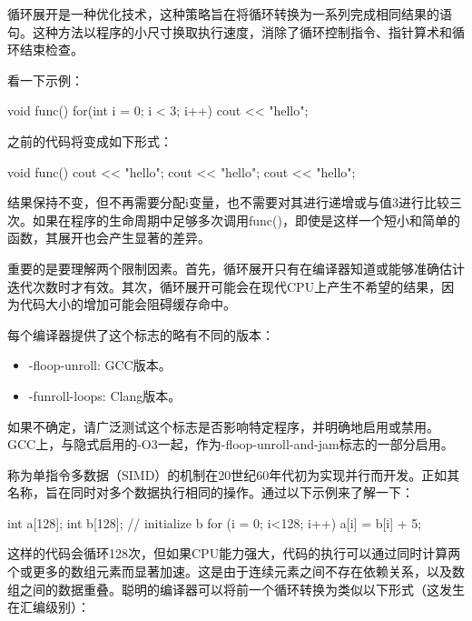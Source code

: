 
循环展开是一种优化技术，这种策略旨在将循环转换为一系列完成相同结果的语句。这种方法以程序的小尺寸换取执行速度，消除了循环控制指令、指针算术和循环结束检查。

看一下示例：

\begin{cpp}
void func() {
    for(int i = 0; i < 3; i++)
    cout << "hello\n";
}
\end{cpp}

之前的代码将变成如下形式：

\begin{cpp}
void func() {
    cout << "hello\n";
    cout << "hello\n";
    cout << "hello\n";
}
\end{cpp}

结果保持不变，但不再需要分配i变量，也不需要对其进行递增或与值3进行比较三次。如果在程序的生命周期中足够多次调用func()，即使是这样一个短小和简单的函数，其展开也会产生显著的差异。

重要的是要理解两个限制因素。首先，循环展开只有在编译器知道或能够准确估计迭代次数时才有效。其次，循环展开可能会在现代CPU上产生不希望的结果，因为代码大小的增加可能会阻碍缓存命中。

每个编译器提供了这个标志的略有不同的版本：

\begin{itemize}
\item
-floop-unroll: GCC版本。

\item
-funroll-loops: Clang版本。
\end{itemize}

如果不确定，请广泛测试这个标志是否影响特定程序，并明确地启用或禁用。GCC上，与隐式启用的-O3一起，作为-floop-unroll-and-jam标志的一部分启用。


称为单指令多数据（SIMD）的机制在20世纪60年代初为实现并行而开发。正如其名称，旨在同时对多个数据执行相同的操作。通过以下示例来了解一下：

\begin{cpp}
int a[128];
int b[128];
// initialize b
for (i = 0; i<128; i++)
    a[i] = b[i] + 5;
\end{cpp}

这样的代码会循环128次，但如果CPU能力强大，代码的执行可以通过同时计算两个或更多的数组元素而显著加速。这是由于连续元素之间不存在依赖关系，以及数组之间的数据重叠。聪明的编译器可以将前一个循环转换为类似以下形式（这发生在汇编级别）：


